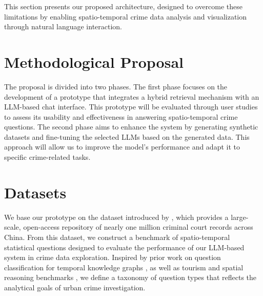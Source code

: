 This section presents our proposed architecture, designed to overcome these limitations by enabling spatio-temporal crime data analysis and visualization through natural language interaction.



\section{Methodological Proposal}

The proposal is divided into two phases. The first phase focuses on the development of a prototype that integrates a hybrid retrieval mechanism with an LLM-based chat interface. This prototype will be evaluated through user studies to assess its usability and effectiveness in answering spatio-temporal crime questions. The second phase aims to enhance the system by generating synthetic datasets and fine-tuning the selected LLMs based on the generated data. This approach will allow us to improve the model's performance and adapt it to specific crime-related tasks.



\section{Datasets}


We base our prototype on the dataset introduced by \cite{Zhang2025CrimeDatasetChina}, which provides a large-scale, open-access repository of nearly one million criminal court records across China. From this dataset, we construct a benchmark of spatio-temporal statistical questions designed to evaluate the performance of our LLM-based system in crime data exploration. Inspired by prior work on question classification for temporal knowledge graphs \cite{Saxena2021TemporalKGQA}, as well as tourism and spatial reasoning benchmarks \cite{Contractor2020QATourism, Dai2024QASTKG}, we define a taxonomy of question types that reflects the analytical goals of urban crime investigation.

